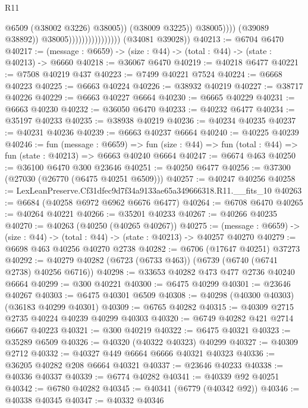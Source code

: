 \begin{lexlean}{R11}
\begin{coremodule}
                                                      @6509
                                                      (@38002 @3226)
                                                      @38005))
                                                  (@38009 @3225))
                                                @38005))))
                                        (@39089 @38892))
                                      @38005))))))))))))))))
      (@34081 @39028))
@40213 := @6704 @6470
@40217 := (message : @6659) -> (size : @44) -> (total : @44) -> (state : @40213) -> @6660
@40218 := @36067 @6470
@40219 := @40218 @6477
@40221 := @7508 @40219 @437
@40223 := @7499 @40221 @7524
@40224 := @6668 @40223
@40225 := @6663 @40224
@40226 := @38932 @40219
@40227 := @38717 @40226
@40229 := @6663 @40227 @6664
@40230 := @6665 @40229
@40231 := @6663 @40230
@40232 := @36050 @6470
@40233 := @40232 @6477
@40234 := @35197 @40233
@40235 := @38938 @40219
@40236 := @40234 @40235
@40237 := @40231 @40236
@40239 := @6663 @40237 @6664
@40240 := @40225 @40239
@40246 := fun (message : @6659) =>
  fun (size : @44) => fun (total : @44) => fun (state : @40213) => @6663 @40240 @6664
@40247 := @6674 @463
@40250 := @36100 @6470 @300 @23646
@40251 := @40250 @6477
@40256 := @37300 (@27030 (@26770 (@6475 @40251 @6509)))
@40257 := @40247 @40256
@40258 := LexLeanPreserve.Cf31dfec9d7f34a9133ae65a349666318.R11.__fits_10
@40263 := @6684 (@40258 @6972 @6962 @6676 @6477)
@40264 := @6708 @6470
@40265 := @40264 @40221
@40266 := @35201 @40233
@40267 := @40266 @40235
@40270 := @40263 (@40250 (@40265 @40267))
@40275 := (message : @6659) -> (size : @44) -> (total : @44) -> (state : @40213) -> @40257 @40270
@40279 := @6698 @463 @40256 @40270 @2738
@40282 := @6706 (@17647 @40251) @37273
@40292 := @40279 @40282 (@6723 (@6733 @463)) (@6739 (@6740 (@6741 @2738) @40256 @6716))
@40298 := @33653 @40282 @473 @477 @2736 @40240 @6664
@40299 := @300 @40221
@40300 := @6475 @40299
@40301 := @23646 @40267
@40303 := @6475 @40301 @6509
@40308 := @40298 (@40300 @40303) (@36183 @40299 @40301)
@40309 := @6765 @40282
@40315 := @40309 @2715 @2735 @40224 @40239 @40299 @40303
@40320 := @6749 @40282 @421 @2714 @6667 @40223
@40321 := @300 @40219
@40322 := @6475 @40321
@40323 := @35289 @6509
@40326 := @40320 (@40322 @40323) @40299
@40327 := @40309 @2712
@40332 := @40327 @449 @6664 @6666 @40321 @40323
@40336 := @36205 @40282 @208 @6664 @40321
@40337 := @23646 @40233
@40338 := @40336 @40337
@40339 := @6774 @40282
@40341 := @40339 @92 @40251
@40342 := @6780 @40282
@40345 := @40341 (@6779 (@40342 @92))
@40346 := @40338 @40345
@40347 := @40332 @40346

\end{coremodule}
\end{lexlean}
